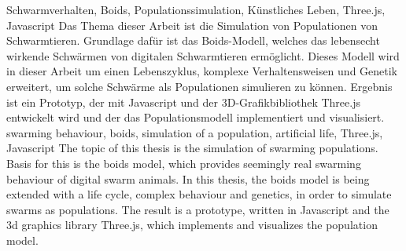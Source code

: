 \documentclass[draft=false
              ,paper=a4
              ,twoside=false
              ,fontsize=11pt
              ,headsepline
              ,BCOR10mm
              ,DIV11
              ,bibtotoc
              ,liststotoc
              ]{scrbook}
\begin{document}


\frontmatter

\maketitle

\onehalfspacing

\HAWAbstractPage
{Schwarmverhalten, Boids, Populationssimulation, Künstliches Leben, Three.js, Javascript}%
{Das Thema dieser Arbeit ist die Simulation von Populationen von Schwarmtieren. Grundlage dafür ist das Boids-Modell, welches das lebensecht wirkende Schwärmen von digitalen Schwarmtieren ermöglicht. Dieses Modell wird in dieser Arbeit um einen Lebenszyklus, komplexe Verhaltensweisen und Genetik erweitert, um solche Schwärme als Populationen simulieren zu können. Ergebnis ist ein Prototyp, der mit Javascript und der 3D-Grafikbibliothek Three.js entwickelt wird und der das Populationsmodell implementiert und visualisiert.}
{swarming behaviour, boids, simulation of a population, artificial life, Three.js, Javascript}%
{The topic of this thesis is the simulation of swarming populations. Basis for this is the boids model, which provides seemingly real swarming behaviour of digital swarm animals. In this thesis, the boids model is being extended with a life cycle, complex behaviour and genetics, in order to simulate swarms as populations. The result is a prototype, written in Javascript and the 3d graphics library Three.js, which implements and visualizes the population model.}

\newpage
\singlespacing

\tableofcontents
\newpage
\listoftables
\listoffigures

\mainmatter
\onehalfspacing
\end{document}
